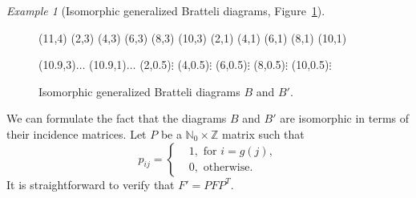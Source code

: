 \documentclass[11pt, twoside]{amsart}
\theoremstyle{definition}
\theoremstyle{remark}
\newtheorem{example}[definition]{Example}
\theoremstyle{plain}
\numberwithin{equation}{section}
\begin{document}
\begin{example}[Isomorphic generalized Bratteli 
diagrams, Figure~\ref{Fig:Isom_BD}]
\begin{figure}
\begin{graph}
\end{graph}

\begin{graph}(11,4)
 (2,3)
 (4,3)
 (6,3)
 (8,3)
  (10,3)
 (2,1)
 (4,1)
 (6,1)
  (8,1)
    (10,1)

     

 

    
  
    
  

 
 \freetext(10.9,3){$\ldots$}
  \freetext(10.9,1){$\ldots$}
  \freetext(2,0.5){$\vdots$}
  \freetext(4,0.5){$\vdots$}
    \freetext(6,0.5){$\vdots$}
      \freetext(8,0.5){$\vdots$}  
        \freetext(10,0.5){$\vdots$} 
    
\end{graph}
\caption{Isomorphic generalized Bratteli diagrams $B$ and 
$B'$.}\label{Fig:Isom_BD}
\end{figure}

We can formulate the fact that the diagrams $B$ and $B'$ are isomorphic in terms of their incidence matrices. Let $P$ be a $\mathbb{N}_0 \times \mathbb{Z}$ matrix such that
$$
p_{ij} = 
\left\{
\begin{aligned}
& 1, \mbox{ for } i = g(j),\\
& 0, \mbox{ otherwise. }
\end{aligned}
\right.
$$ 
It is straightforward to verify that $F' = PFP^T$.
\end{example}
\end{document}
